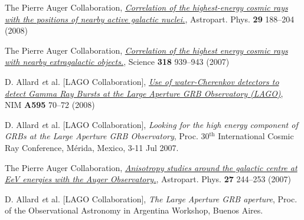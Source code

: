 \begin{etaremune}
\item {}The Pierre Auger Collaboration,
\href{http://dx.doi.org/10.1016/j.astropartphys.2008.01.002}{\emph{Correlation
of the highest-energy cosmic rays with the positions of nearby active galactic
nuclei.}}, Astropart. Phys. {\bf 29} 188--204 (2008)

\item {}The Pierre Auger Collaboration,
\href{http://dx.doi.org/10.1126/science.1151124}{\emph{Correlation of the
highest energy cosmic rays with nearby extragalactic objects.}}, Science {\bf
318} 939--943 (2007)

\item {}D. Allard {\emph et al.} [LAGO Collaboration],
\href{http://dx.doi.org/10.1016/j.nima.2008.07.041}{\emph{Use of
water-Cherenkov detectors to detect Gamma Ray Bursts at the Large Aperture GRB
Observatory (LAGO)}}, NIM {\bf A595} 70--72 (2008)

\item {}D. Allard {\emph et al.} [LAGO Collaboration], {\emph{Looking for
the high energy component of GRBs at the Large Aperture GRB Observatory}}, \en
Proc. 30$^{\mathrm{th}}$ International Cosmic Ray Conference,  Mérida, Mexico, 3-11 Jul
2007.

\item {}The Pierre Auger Collaboration,
\href{http://dx.doi.org/10.1016/j.astropartphys.2006.11.002}{\emph{Anisotropy
studies around the galactic centre at EeV energies with the Auger
Observatory.}},  Astropart. Phys. {\bf 27} 244--253 (2007)

\item {}D. Allard {\emph et al.} [LAGO Collaboration], {\emph{The Large
Aperture GRB aperture}}, \en Proc. of the Observational Astronomy in Argentina
Workshop, Buenos Aires.

\end{etaremune}
